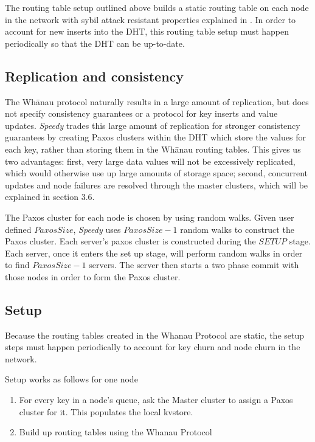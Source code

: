 \documentclass[letter]{article}
\newcommand{\sys}{\textit{Speedy}}
\begin{document}
The routing table setup outlined above builds a static routing table on each node in the network with sybil attack resistant properties explained in \cite{whanau}. In order to account for new inserts into the DHT, this routing table setup must happen periodically so that the DHT can be up-to-date.

\subsection{Replication and consistency}

The Wh\={a}nau protocol naturally results in a large amount of replication,
but does not specify consistency guarantees or a protocol for key inserts
and value updates. \sys{} trades this large amount of replication for
stronger consistency guarantees by creating Paxos clusters within
the DHT which store the values for each key, rather than storing them
in the Wh\={a}nau routing tables. This gives us two advantages: first,
very large data values will not be excessively replicated, which would
otherwise use up large amounts of storage space; second, concurrent
updates and node failures are resolved through the master clusters, which will be
explained in section 3.6.

The Paxos cluster for each node is chosen by using random walks. Given user defined
${PaxosSize}$, \sys{} uses ${PaxosSize-1}$ random walks to construct the Paxos cluster.
Each server's paxos cluster is constructed during the $SETUP$ stage. Each server,
once it enters the set up stage, will perform random walks in order to find $PaxosSize-1$
servers. The server then starts a two phase commit with those nodes in order to form
the Paxos cluster.

\subsection{Setup}
Because the routing tables created in the Whanau Protocol are static, the setup steps must happen periodically to account for key churn and node churn in the network.

Setup works as follows for one node
\begin{enumerate}
\item For every key in a node's queue, ask the Master cluster to assign a Paxos cluster for it. This populates the local kvstore.
\item Build up routing tables using the Whanau Protocol
\end{enumerate}
\end{document}
